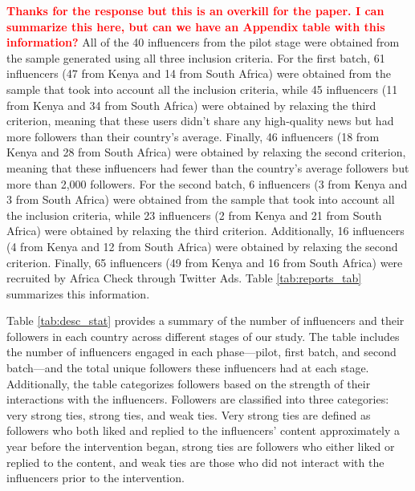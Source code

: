 \textcolor{red}{\bf Thanks for the response but this is an overkill for the paper. I can summarize this here, but can we have an Appendix table with this information?}
 All of the 40 influencers from the pilot stage were obtained from the sample generated using all three inclusion criteria. For the first batch, 61 influencers (47 from Kenya and 14 from South Africa) were obtained from the sample that took into account all the inclusion criteria, while 45 influencers (11 from Kenya and 34 from South Africa) were obtained by relaxing the third criterion, meaning that these users didn't share any high-quality news but had more followers than their country's average. Finally, 46 influencers (18 from Kenya and 28 from South Africa) were obtained by relaxing the second criterion, meaning that these influencers had fewer than the country's average followers but more than 2,000 followers. For the second batch, 6 influencers (3 from Kenya and 3 from South Africa) were obtained from the sample that took into account all the inclusion criteria, while 23 influencers (2 from Kenya and 21 from South Africa) were obtained by relaxing the third criterion. Additionally, 16 influencers (4 from Kenya and 12 from South Africa) were obtained by relaxing the second criterion. Finally, 65 influencers (49 from Kenya and 16 from South Africa) were recruited by Africa Check through Twitter Ads. Table \ref{tab:reports_tab} summarizes this information. 


Table \ref{tab:desc_stat} provides a summary of the number of influencers and their followers in each country across different stages of our study. The table includes the number of influencers engaged in each phase—pilot, first batch, and second batch—and the total unique followers these influencers had at each stage. Additionally, the table categorizes followers based on the strength of their interactions with the influencers. Followers are classified into three categories: very strong ties, strong ties, and weak ties. Very strong ties are defined as followers who both liked and replied to the influencers' content approximately a year before the intervention began, strong ties are followers who either liked or replied to the content, and weak ties are those who did not interact with the influencers prior to the intervention. 

